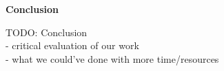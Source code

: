 \begin{center}
	{\Large \bfseries  Conclusion}
\end{center}

TODO: Conclusion \\
- critical evaluation of our work \\
- what we could've done with more time/resources
